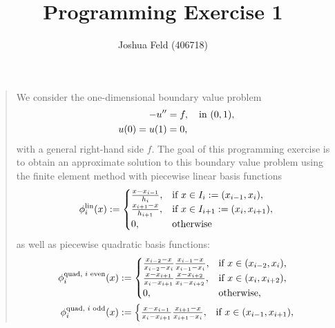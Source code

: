 \documentclass[english]{exercise}
\title{Programming Exercise 1}
\author{Joshua Feld (406718)}
\begin{document}
    \maketitle


    \section{}
    
    \begin{quote}
        We consider the one-dimensional boundary value problem
        \begin{align*}
            -u'' &= f, \quad \text{in }\parentheses*{0, 1},\\
            u\parentheses*{0} = u\parentheses*{1} &= 0,
        \end{align*}
        with a general right-hand side \(f\).
        The goal of this programming exercise is to obtain an approximate solution to this boundary value problem using the finite element method with piecewise linear basis functions
        \[
            \phi_i^{\text{lin}}\parentheses*{x} := \begin{cases}
                \frac{x - x_{i - 1}}{h_i}, & \text{if }x \in I_i := \parentheses*{x_{i - 1}, x_i},\\
                \frac{x_{i + 1} - x}{h_{i + 1}}, & \text{if }x \in I_{i + 1} := \parentheses*{x_i, x_{i + 1}},\\
                0, & \text{otherwise}
            \end{cases}
        \]
        as well as piecewise quadratic basis functions:
        \begin{align*}
            \phi_i^{\text{quad, }i\text{ even}}\parentheses*{x} &:= \begin{cases}
                \frac{x_{i - 2} - x}{x_{i - 2} - x_i}\frac{x_{i - 1} - x}{x_{i - 1} - x_i}, & \text{if }x \in \parentheses*{x_{i - 2}, x_i},\\
                \frac{x - x_{i + 1}}{x_i - x_{i + 1}}\frac{x - x_{i + 2}}{x_i - x_{i + 2}}, & \text{if }x \in \parentheses*{x_i, x_{i + 2}},\\
                0, & \text{otherwise},
            \end{cases}\\
            \phi_i^{\text{quad, }i\text{ odd}}\parentheses*{x} &:= \begin{cases}
                \frac{x - x_{i - 1}}{x_i - x_{i + 1}}\frac{x_{i + 1} - x}{x_{i + 1} - x_i}, & \text{if }x \in \parentheses*{x_{i - 1}, x_{i + 1}},\\

\end{cases}
\end{align*}
\end{quote}
\end{document}
